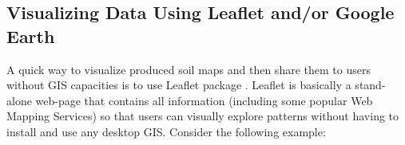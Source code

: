 \documentclass[10pt,b5paper,]{book}
\newenvironment{Shaded}{\begin{snugshade}}{\end{snugshade}}
\newcommand{\CommentTok}[1]{\textcolor[rgb]{0.56,0.35,0.01}{\textit{#1}}}
\newcommand{\DataTypeTok}[1]{\textcolor[rgb]{0.13,0.29,0.53}{#1}}
\newcommand{\DecValTok}[1]{\textcolor[rgb]{0.00,0.00,0.81}{#1}}
\newcommand{\KeywordTok}[1]{\textcolor[rgb]{0.13,0.29,0.53}{\textbf{#1}}}
\newcommand{\NormalTok}[1]{#1}
\newcommand{\OperatorTok}[1]{\textcolor[rgb]{0.81,0.36,0.00}{\textbf{#1}}}
\newcommand{\OtherTok}[1]{\textcolor[rgb]{0.56,0.35,0.01}{#1}}
\newcommand{\StringTok}[1]{\textcolor[rgb]{0.31,0.60,0.02}{#1}}
\theoremstyle{definition}
\theoremstyle{definition}
\theoremstyle{definition}
\theoremstyle{remark}
\begin{document}
\hypertarget{visualizing-data-using-leaflet-andor-google-earth}{%
\subsection{Visualizing Data Using Leaflet and/or Google
Earth}\label{visualizing-data-using-leaflet-andor-google-earth}}

A quick way to visualize produced soil maps and then share them to users
without GIS capacities is to use Leaflet package . Leaflet is basically
a stand-alone web-page that contains all information (including some
popular Web Mapping Services) so that users can visually explore
patterns without having to install and use any desktop GIS. Consider the
following example:

\begin{Shaded}
\end{Shaded}
\end{document}
